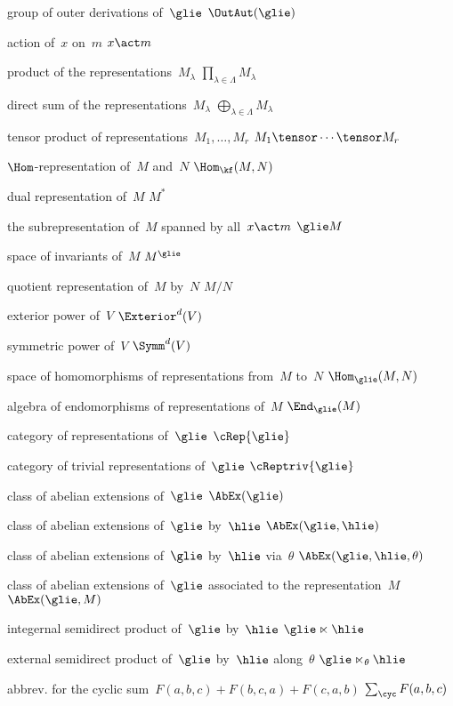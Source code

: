 {group of outer derivations of~$\glie$}
{$\OutAut(\glie)$}

{action of~$x$ on~$m$}
{$x \act m$}

{product of the representations~$M_\lambda$}
{$\prod_{\lambda \in \Lambda} M_\lambda$}

{direct sum of the representations~$M_\lambda$}
{$\bigoplus_{\lambda \in \Lambda} M_\lambda$}

{tensor product of representations~$M_1, \dotsc, M_r$}
{$M_1 \tensor \dotsb \tensor M_r$}

{$\Hom$-representation of~$M$ and~$N$}
{$\Hom_{\kf}(M, N)$}

{dual representation of~$M$}
{$M^*$}

{the subrepresentation of~$M$ spanned by all~$x \act m$}
{$\glie M$}

{space of invariants of~$M$}
{$M^{\glie}$}

{quotient representation of~$M$ by~$N$}
{$M/N$}

{ exterior power of~$V$}
{$\Exterior^d(V)$}

{ symmetric power of~$V$}
{$\Symm^d(V)$}

{space of homomorphisms of representations from~$M$ to~$N$}
{$\Hom_{\glie}(M,N)$}

{algebra of endomorphisms of representations of~$M$}
{$\End_{\glie}(M)$}

{category of representations of~$\glie$}
{$\cRep{\glie}$}

{category of trivial representations of~$\glie$}
{$\cReptriv{\glie}$}

{class of abelian extensions of~$\glie$}
{$\AbEx(\glie)$}

{class of abelian extensions of~$\glie$ by~$\hlie$}
{$\AbEx(\glie, \hlie)$}

{class of abelian extensions of~$\glie$ by~$\hlie$ via~$\theta$}
{$\AbEx(\glie, \hlie, \theta)$}

{class of abelian extensions of~$\glie$ associated to the representation~$M$}
{$\AbEx(\glie, M)$}

{integernal semidirect product of~$\glie$ by~$\hlie$}
{$\glie \ltimes \hlie$}

{external semidirect product of~$\glie$ by~$\hlie$ along~$\theta$}
{$\glie \ltimes_\theta \hlie$}

{abbrev. for the cyclic sum~$F(a,b,c) + F(b,c,a) + F(c,a,b)$}
{$\sum_{\cyc} F(a,b,c)$}
